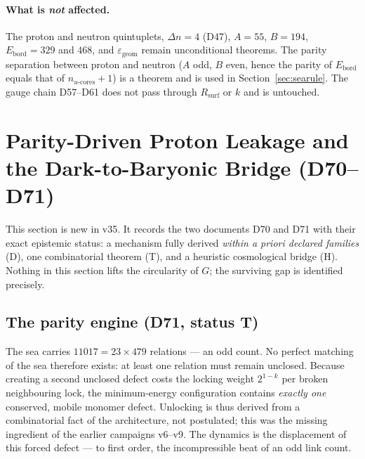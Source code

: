 \documentclass[11pt,a4paper]{article}
\theoremstyle{plain}
\theoremstyle{definition}
\theoremstyle{remark}
\newcommand{\Rsurf}{R_{\mathrm{surf}}}
\begin{document}
\paragraph{What is \emph{not} affected.} The proton and neutron quintuplets, $\Delta n=4$ (D47), $A=55$, $B=194$, $E_{\mathrm{bord}}=329$ and $468$, and $\varepsilon_{\mathrm{geom}}$ remain unconditional theorems. The parity separation between proton and neutron ($A$ odd, $B$ even, hence the parity of $E_{\mathrm{bord}}$ equals that of $n_{u\text{-cores}}+1$) is a theorem and is used in Section~\ref{sec:searule}. The gauge chain D57--D61 does not pass through $\Rsurf$ or $k$ and is untouched.

\section{Parity-Driven Proton Leakage and the Dark-to-Baryonic Bridge (D70--D71)}\label{sec:D70D71}

This section is new in v35. It records the two documents D70 and D71 with their exact epistemic status: a mechanism fully derived \emph{within a priori declared families} (D), one combinatorial theorem (T), and a heuristic cosmological bridge (H). Nothing in this section lifts the circularity of $G$; the surviving gap is identified precisely.

\subsection{The parity engine (D71, status T)}
The sea carries $11017=23\times479$ relations --- an odd count. No perfect matching of the sea therefore exists: at least one relation must remain unclosed. Because creating a second unclosed defect costs the locking weight $2^{1-k}$ per broken neighbouring lock, the minimum-energy configuration contains \emph{exactly one} conserved, mobile monomer defect. Unlocking is thus derived from a combinatorial fact of the architecture, not postulated; this was the missing ingredient of the earlier campaigns v6--v9. The dynamics is the displacement of this forced defect --- to first order, the incompressible beat of an odd link count.
\end{document}

